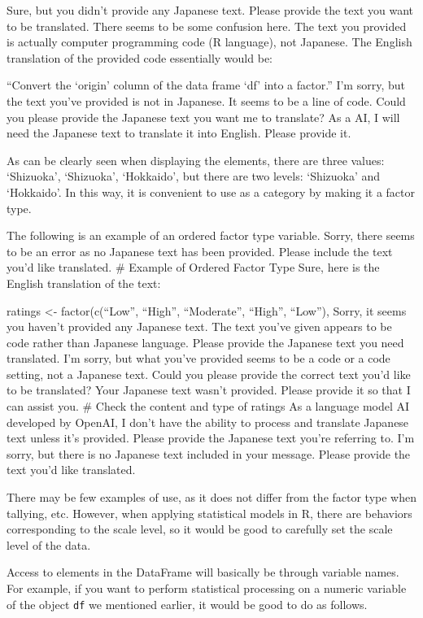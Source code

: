 \documentclass[
  a4paper,
]{book}
\begin{document}
Sure, but you didn't provide any Japanese text. Please provide the text
you want to be translated. There seems to be some confusion here. The
text you provided is actually computer programming code (R language),
not Japanese. The English translation of the provided code essentially
would be:

``Convert the `origin' column of the data frame `df' into a factor.''
I'm sorry, but the text you've provided is not in Japanese. It seems to
be a line of code. Could you please provide the Japanese text you want
me to translate? As a AI, I will need the Japanese text to translate it
into English. Please provide it.

As can be clearly seen when displaying the elements, there are three
values: `Shizuoka', `Shizuoka', `Hokkaido', but there are two levels:
`Shizuoka' and `Hokkaido'. In this way, it is convenient to use as a
category by making it a factor type.

The following is an example of an ordered factor type variable. Sorry,
there seems to be an error as no Japanese text has been provided. Please
include the text you'd like translated. \# Example of Ordered Factor
Type Sure, here is the English translation of the text:

ratings \textless- factor(c(``Low'', ``High'', ``Moderate'', ``High'',
``Low''), Sorry, it seems you haven't provided any Japanese text. The
text you've given appears to be code rather than Japanese language.
Please provide the Japanese text you need translated. I'm sorry, but
what you've provided seems to be a code or a code setting, not a
Japanese text. Could you please provide the correct text you'd like to
be translated? Your Japanese text wasn't provided. Please provide it so
that I can assist you. \# Check the content and type of ratings As a
language model AI developed by OpenAI, I don't have the ability to
process and translate Japanese text unless it's provided. Please provide
the Japanese text you're referring to. I'm sorry, but there is no
Japanese text included in your message. Please provide the text you'd
like translated.

There may be few examples of use, as it does not differ from the factor
type when tallying, etc. However, when applying statistical models in R,
there are behaviors corresponding to the scale level, so it would be
good to carefully set the scale level of the data.

Access to elements in the DataFrame will basically be through variable
names. For example, if you want to perform statistical processing on a
numeric variable of the object \texttt{df} we mentioned earlier, it
would be good to do as follows.
\end{document}
